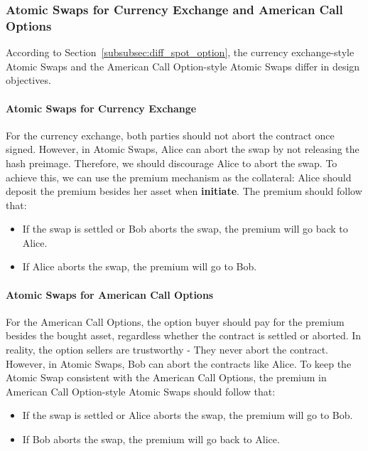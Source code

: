 \subsubsection{Atomic Swaps for Currency Exchange and American Call Options}
\label{subsubsec:design_obj}

According to Section~\ref{subsubsec:diff_spot_option}, the currency exchange-style Atomic Swaps and the American Call Option-style Atomic Swaps differ in design objectives.

\paragraph{Atomic Swaps for Currency Exchange}
For the currency exchange, both parties should not abort the contract once signed.
However, in Atomic Swaps, Alice can abort the swap by not releasing the hash preimage.
Therefore, we should discourage Alice to abort the swap.
To achieve this, we can use the premium mechanism as the collateral: Alice should deposit the premium besides her asset when \textbf{initiate}.
The premium should follow that:

\begin{itemize}
    \item If the swap is settled or Bob aborts the swap, the premium will go back to Alice.
    \item If Alice aborts the swap, the premium will go to Bob.
\end{itemize}

\paragraph{Atomic Swaps for American Call Options}
For the American Call Options, the option buyer should pay for the premium besides the bought asset, regardless whether the contract is settled or aborted.
In reality, the option sellers are trustworthy - They never abort the contract.
However, in Atomic Swaps, Bob can abort the contracts like Alice.
To keep the Atomic Swap consistent with the American Call Options,
the premium in American Call Option-style Atomic Swaps should follow that: 

\begin{itemize}
    \item If the swap is settled or Alice aborts the swap, the premium will go to Bob.
    \item If Bob aborts the swap, the premium will go back to Alice.
\end{itemize}













